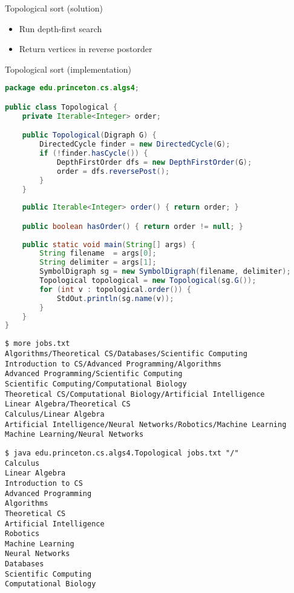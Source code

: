 \documentclass[8pt,a4paper,compress]{beamer}
\begin{document}
\begin{frame}[fragile]
\pause

Topological sort (solution)
\begin{itemize}
\item Run depth-first search

\item Return vertices in reverse postorder
\end{itemize}

\pause
\bigskip

Topological sort (implementation)
\begin{lstlisting}[language=java,style=focusin]
package edu.princeton.cs.algs4;

public class Topological {
    private Iterable<Integer> order; 

    public Topological(Digraph G) {
        DirectedCycle finder = new DirectedCycle(G);
        if (!finder.hasCycle()) {
            DepthFirstOrder dfs = new DepthFirstOrder(G);
            order = dfs.reversePost();
        }
    }
    
    public Iterable<Integer> order() { return order; }

    public boolean hasOrder() { return order != null; }
    
    public static void main(String[] args) {
        String filename  = args[0];
        String delimiter = args[1];
        SymbolDigraph sg = new SymbolDigraph(filename, delimiter);
        Topological topological = new Topological(sg.G());
        for (int v : topological.order()) {
            StdOut.println(sg.name(v));
        }
    }
}
\end{lstlisting}
\end{frame}

\begin{frame}[fragile]
\pause

\begin{lstlisting}[language={},style=focusin]
$ more jobs.txt 
Algorithms/Theoretical CS/Databases/Scientific Computing
Introduction to CS/Advanced Programming/Algorithms
Advanced Programming/Scientific Computing
Scientific Computing/Computational Biology
Theoretical CS/Computational Biology/Artificial Intelligence
Linear Algebra/Theoretical CS
Calculus/Linear Algebra
Artificial Intelligence/Neural Networks/Robotics/Machine Learning
Machine Learning/Neural Networks
\end{lstlisting}

\pause

\begin{lstlisting}[language={},style=focusin]
$ java edu.princeton.cs.algs4.Topological jobs.txt "/"
Calculus
Linear Algebra
Introduction to CS
Advanced Programming
Algorithms
Theoretical CS
Artificial Intelligence
Robotics
Machine Learning
Neural Networks
Databases
Scientific Computing
Computational Biology
\end{lstlisting}
\end{frame}
\end{document}
